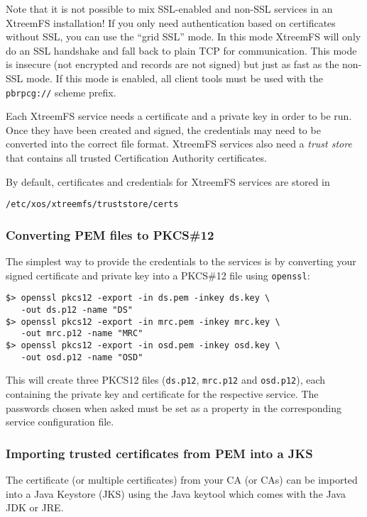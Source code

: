 \documentclass[a4paper,10pt]{book}
\begin{document}
Note that it is not possible to mix SSL-enabled and non-SSL services in an XtreemFS installation! If you only need authentication based on certificates without SSL, you can use the ``grid SSL'' mode. In this mode XtreemFS will only do an SSL handshake and fall back to plain TCP for communication. This mode is insecure (not encrypted and records are not signed) but just as fast as the non-SSL mode. If this mode is enabled, all client tools must be used with the \texttt{pbrpcg://} scheme prefix.

Each XtreemFS service needs a certificate and a private key in order to be run. Once they have been created and signed, the credentials may need to be converted into the correct file format. XtreemFS services also need a \textit{trust store} that contains all trusted Certification Authority certificates.

By default, certificates and credentials for XtreemFS services are stored in
\begin{verbatim}
/etc/xos/xtreemfs/truststore/certs
\end{verbatim}


\subsubsection{Converting PEM files to PKCS\#12}
The simplest way to provide the credentials to the services is by converting your signed certificate and private key into a PKCS\#12 file using \texttt{openssl}:


\begin{verbatim}
$> openssl pkcs12 -export -in ds.pem -inkey ds.key \
   -out ds.p12 -name "DS"
$> openssl pkcs12 -export -in mrc.pem -inkey mrc.key \
   -out mrc.p12 -name "MRC"
$> openssl pkcs12 -export -in osd.pem -inkey osd.key \
   -out osd.p12 -name "OSD"
\end{verbatim}


This will create three PKCS12 files (\texttt{ds.p12}, \texttt{mrc.p12} and \texttt{osd.p12}), each containing the private key and certificate for the respective service. The passwords chosen when asked must be set as a property in the corresponding service configuration file.


\subsubsection{Importing trusted certificates from PEM into a JKS}

The certificate (or multiple certificates) from your CA (or CAs) can be imported into a Java Keystore (JKS)  using the Java keytool which comes with the Java JDK or JRE.
\end{document}
